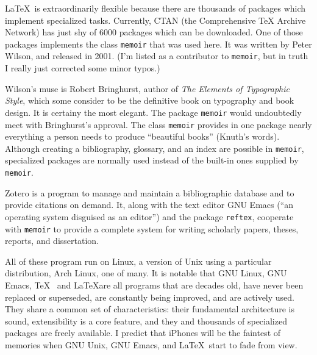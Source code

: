 LaTeX is extraordinarily flexible because there are thousands of packages which implement specialized tasks. Currently, CTAN (the Comprehensive TeX Archive Network) has just shy of 6000 packages which can be downloaded. One of those packages implements the class \texttt{memoir} that was used here. It was written by Peter Wilson, and released in 2001. (I'm listed as a contributor to \texttt{memoir}, but in truth I really just corrected some minor typos.)
\newpage
\begin{center}
  \textbf{\quad\quad{}\quad\quad{}\quad\quad{}\quad\quad{}}
\end{center}
Wilson's muse is Robert Bringhurst, author of \textit{The Elements of Typographic Style}, which some consider to be the definitive book on typography and book design. It is certainy the most elegant. The package \texttt{memoir} would undoubtedly meet with Bringhurst's approval.  The class \texttt{memoir} provides in one package nearly everything a person needs to produce ``beautiful books'' (Knuth's words). Although creating a bibliography, glossary, and an index are possible in \texttt{memoir}, specialized packages are normally used instead of the built-in ones supplied by \texttt{memoir}.
\begin{center}
  \textbf{\quad\quad{}\quad\quad{}\quad\quad{}\quad\quad{}}
\end{center}
Zotero is a program to manage and maintain a bibliographic database and to provide citations on demand. It, along with the text editor GNU Emacs (``an operating system disguised as an editor'') and the package \texttt{reftex}, cooperate with \texttt{memoir} to provide a complete system for writing scholarly papers, theses, reports, and dissertation.
\begin{center}
  \textbf{\quad\quad{}\quad\quad{}\quad\quad{}\quad\quad{}}
\end{center}
All of these program run on Linux, a version of Unix using a particular distribution, Arch Linux, one of many. It is notable that GNU Linux, GNU Emacs, \TeX  and \LaTeX are all programs that are decades old, have never been replaced or superseded, are constantly being improved, and are actively used. They share a common set of characteristics: their fundamental architecture is sound, extensibility is a core feature, and they and thousands of specialized packages are freely available. I predict that iPhones will be the faintest of memories when GNU Unix, GNU Emacs, and \LaTeX start to fade from view.
